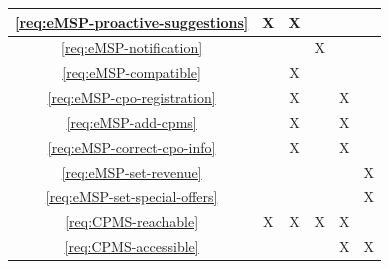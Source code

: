 \begin{table}[h]
\begin{center}
\begin{tabular}{|c||c|c|c|c|c|}
            \ref{req:eMSP-proactive-suggestions}  & X                               & X                              &                              &                                &                                \\\hline
            \ref{req:eMSP-notification}           &                                 &                                & X                            &                                &                                \\\hline
            \ref{req:eMSP-compatible}             &                                 & X                              &                              &                                &                                \\\hline
            \ref{req:eMSP-cpo-registration}       &                                 & X                              &                              & X                              &                                \\\hline
            \ref{req:eMSP-add-cpms}               &                                 & X                              &                              & X                              &                                \\\hline
            \ref{req:eMSP-correct-cpo-info}       &                                 & X                              &                              & X                              &                                \\\hline
            \ref{req:eMSP-set-revenue}            &                                 &                                &                              &                                & X                              \\\hline
            \ref{req:eMSP-set-special-offers}     &                                 &                                &                              &                                & X                              \\\hline
            \ref{req:CPMS-reachable}              & X                               & X                              & X                            & X                              &                                \\\hline
            \ref{req:CPMS-accessible}             &                                 &                                &                              & X                              & X                              \\\hline

\end{tabular}
\end{center}
\end{table}
